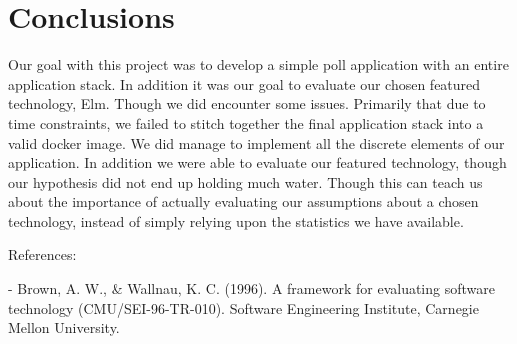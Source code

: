 \section{Conclusions}

Our goal with this project was to develop a simple poll application with an entire application stack. In addition it was our goal to evaluate our chosen featured technology, Elm. Though we did encounter some issues. Primarily that due to time constraints, we failed to stitch together the final application stack into a valid docker image. We did manage to implement all the discrete elements of our application. In addition we were able to evaluate our featured technology, though our hypothesis did not end up holding much water. Though this can teach us about the importance of actually evaluating our assumptions about a chosen technology, instead of simply relying upon the statistics we have available. 

References:

- Brown, A. W., & Wallnau, K. C. (1996). A framework for evaluating software technology (CMU/SEI-96-TR-010). Software Engineering Institute, Carnegie Mellon University.